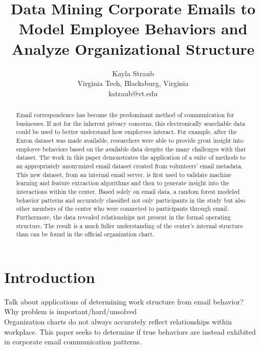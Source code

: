 \documentclass{article}
\begin{document}
\title{Data Mining Corporate Emails to Model Employee Behaviors and Analyze Organizational Structure}
\author{Kayla Straub\\
        Virginia Tech, Blacksburg, Virginia\\
        kstraub@vt.edu}
\maketitle

\begin{abstract}
Email correspondence has become the predominant method of communication for businesses.  If not for the inherent privacy concerns, this electronically searchable data could be used to better understand how employees interact. For example, after the Enron dataset was made available, researchers were able to provide great insight into employee behaviors based on the available data despite the many challenges with that dataset.  The work in this paper demonstrates the application of a suite of methods to an appropriately anonymized email dataset created from volunteers' email metadata.  This new dataset, from an internal email server, is first used to validate machine learning and feature extraction algorithms and then to generate insight into the interactions within the center.  Based solely on email data, a random forest  modeled behavior patterns and accurately classified not only participants in the study but also other members of the center who were connected to participants through email.  Furthermore, the data revealed relationships not present in the formal operating structure.  The result is a much fuller understanding of the center's internal structure than can be found in the official organization chart.
\end{abstract}

\section{Introduction}
Talk about applications of determining work structure from email behavior? \\
Why problem is important/hard/unsolved\\

Organization charts do not always accurately reflect relationships within workplace. This paper seeks to determine if true behaviors are instead exhibited in corporate email communication patterns.
\end{document}
